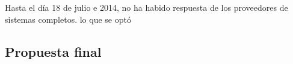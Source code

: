 
Hasta el día 18 de julio e 2014, no ha habido respuesta de los
proveedores de sistemas completos. lo que se optó

\subsection{Propuesta final}
\label{sec:ppfinal}

